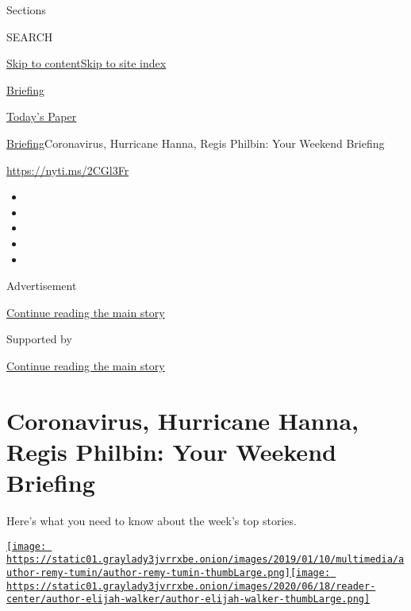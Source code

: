 Sections

SEARCH

\protect\hyperlink{site-content}{Skip to
content}\protect\hyperlink{site-index}{Skip to site index}

\href{https://www.nytimes3xbfgragh.onion/interactive/2018/briefing/global-morning-briefing-newsletter-signup.html}{Briefing}

\href{https://myaccount.nytimes3xbfgragh.onion/auth/login?response_type=cookie\&client_id=vi}{}

\href{https://www.nytimes3xbfgragh.onion/section/todayspaper}{Today's
Paper}

\href{/interactive/2018/briefing/global-morning-briefing-newsletter-signup.html}{Briefing}\textbar{}Coronavirus,
Hurricane Hanna, Regis Philbin: Your Weekend Briefing

\url{https://nyti.ms/2CGl3Fr}

\begin{itemize}
\item
\item
\item
\item
\item
\end{itemize}

Advertisement

\protect\hyperlink{after-top}{Continue reading the main story}

Supported by

\protect\hyperlink{after-sponsor}{Continue reading the main story}

\hypertarget{coronavirus-hurricane-hanna-regis-philbin-your-weekend-briefing}{%
\section{Coronavirus, Hurricane Hanna, Regis Philbin: Your Weekend
Briefing}\label{coronavirus-hurricane-hanna-regis-philbin-your-weekend-briefing}}

Here's what you need to know about the week's top stories.

\href{https://www.nytimes3xbfgragh.onion/by/remy-tumin}{\texttt{[image: https://static01.graylady3jvrrxbe.onion/images/2019/01/10/multimedia/author-remy-tumin/author-remy-tumin-thumbLarge.png]}}\href{https://www.nytimes3xbfgragh.onion/by/elijah-walker}{\texttt{[image: https://static01.graylady3jvrrxbe.onion/images/2020/06/18/reader-center/author-elijah-walker/author-elijah-walker-thumbLarge.png]}}

